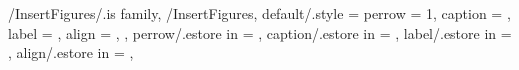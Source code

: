 %
%
%
%
%

%
%
%

\pgfkeys
{
  /InsertFigures/.is family, /InsertFigures,
  default/.style = 
  {
    perrow = 1,
    caption = \empty,
    label = \empty,
    align = \empty,      %
  },
  perrow/.estore in = \TmpMIValueImagePerRow,
  caption/.estore in = \TmpMIValueCaption,
  label/.estore in = \TmpMIValueLabel,
  align/.estore in = \TmpMIValueAlign,      %
} %

{
  \begin{figure}[H]%
  \colorbox{white}{
    \begin{minipage}{\textwidth}{%
        \if {}
        \fi
        \if {}
        \fi
        \if {}
        \fi
        \if {}
        \fi
      }%
      \SetImageCaptionAndLabel{\TmpMIValueCaption}{\TmpMIValueLabel}
    \end{minipage}%
  }%
  \end{figure}%
} %

